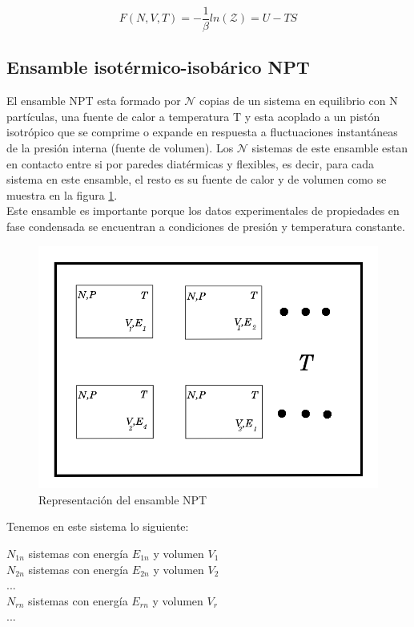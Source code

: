 \begin{equation} \label{potHelm}
    F(N,V,T)=-\frac{1}{\beta}ln(\mathcal{Z})=U-TS
\end{equation}

\subsection{Ensamble isotérmico-isobárico NPT}

El ensamble NPT esta formado por $\mathcal{N}$ copias de un sistema en equilibrio con N partículas, una fuente de calor a temperatura T y esta acoplado a un pistón isotrópico que se comprime o expande en respuesta a fluctuaciones instantáneas de la presión interna (fuente de volumen). Los $\mathcal{N}$ sistemas de este ensamble estan en contacto entre si por paredes diatérmicas y flexibles, es decir, para cada sistema en este ensamble, el resto es su fuente de calor y de volumen como se muestra en la figura \ref{fig:NPTEns}.\\

Este ensamble es importante porque los datos experimentales de propiedades en fase condensada se encuentran a condiciones de presión y temperatura constante.\\


\begin{figure}[!h]
    \centering
    \includegraphics[width=.55\textwidth,keepaspectratio=true]{nptensemble.png}
    \caption{Representación del ensamble NPT \cite{belof2013alternative}}
    \label{fig:NPTEns}
\end{figure}

\newpage

Tenemos en este sistema lo siguiente:\\

\begin{center}
    $N_{1n}$ sistemas con energía $E_{1n}$ y volumen $V_1$\\
    $N_{2n}$ sistemas con energía $E_{2n}$ y volumen $V_2$\\
    ...\\
    $N_{rn}$ sistemas con energía $E_{rn}$ y volumen $V_r$\\
    ...\\
\end{center}

